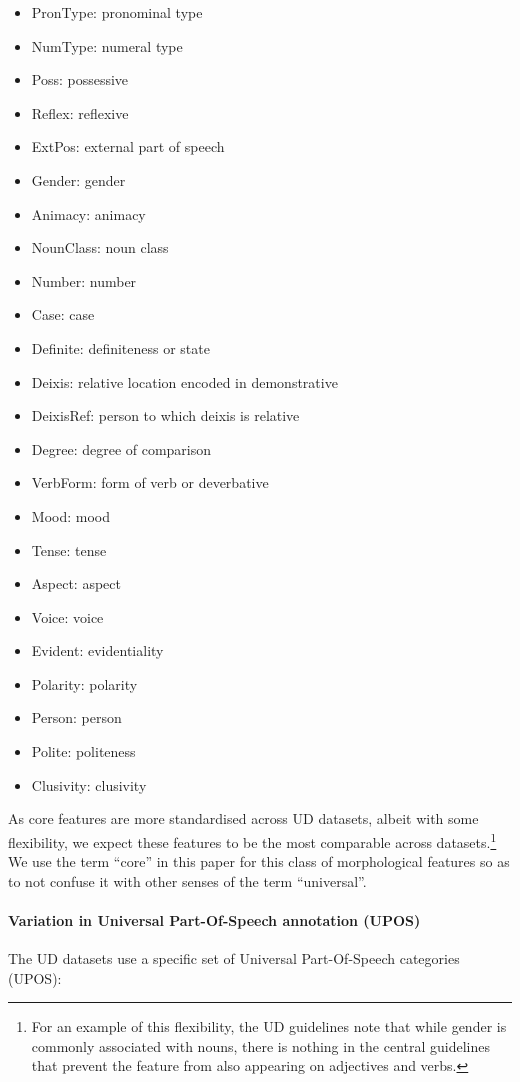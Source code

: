 \documentclass[USenglish]{article}
\begin{document}
\begin{itemize}
    \item PronType: pronominal type 
    \item NumType: numeral type
    \item Poss: possessive
    \item Reflex: reflexive
    \item ExtPos: external part of speech
    \item Gender: gender
    \item Animacy: animacy
    \item NounClass: noun class
    \item Number: number
    \item Case: case
    \item Definite: definiteness or state
    \item Deixis: relative location encoded in demonstrative
    \item DeixisRef: person to which deixis is relative
    \item Degree: degree of comparison
    \item VerbForm: form of verb or deverbative
    \item Mood: mood 
    \item Tense: tense
    \item Aspect: aspect 
    \item Voice: voice
    \item Evident: evidentiality
    \item Polarity: polarity
    \item Person: person
    \item Polite: politeness
    \item Clusivity: clusivity
\end{itemize}

As core features are more standardised across UD datasets, albeit with some flexibility, we expect these features to be the most comparable across datasets.\footnote{For an example of this flexibility, the UD guidelines note that while gender is commonly associated with nouns, there is nothing in the central guidelines that prevent the feature from also appearing on adjectives and verbs.}
We use the term ``core'' in this paper for this class of morphological features so as to not confuse it with other senses of the term ``universal''.

\paragraph{Variation in Universal Part-Of-Speech annotation (UPOS)}
The UD datasets use a specific set of Universal Part-Of-Speech categories (UPOS):
\end{document}
